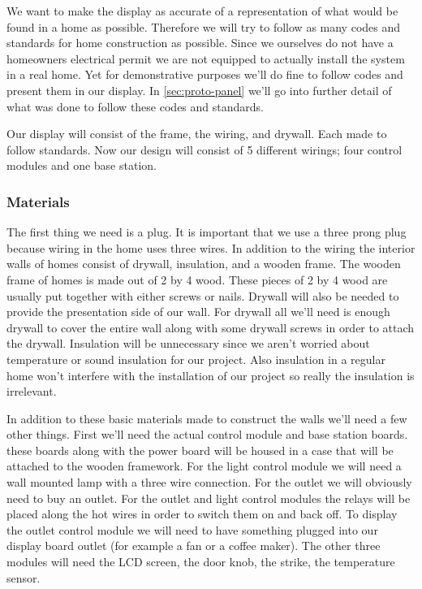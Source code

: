 We want to make the display as accurate of a representation of
what would be found in a home as possible. Therefore we will try to follow as
many codes and standards for home construction as possible. Since we ourselves
do not have a homeowners electrical permit we are not equipped to actually
install the system in a real home. Yet for demonstrative purposes we{}'ll do
fine to follow codes and present them in our display. In \autoref{sec:proto-panel}
we{}'ll go into further detail of what was done to follow these codes and
standards.

Our display will consist of the frame, the wiring, and drywall.
Each made to follow standards. Now our design will consist of 5 different
wirings; four control modules and one base station.

\subsubsection{Materials}
The first thing we need is a plug. It is important that we use a three prong
plug because wiring in the home uses three wires. In addition to the wiring the
interior walls of homes consist of drywall, insulation, and a wooden frame. The
wooden frame of homes is made out of 2 by 4 wood. These pieces of 2 by 4 wood
are usually put together with either screws or nails. Drywall will also be
needed to provide the presentation side of our wall. For drywall all we{}'ll
need is enough drywall to cover the entire wall along with some drywall screws
in order to attach the drywall. Insulation will be unnecessary since we
aren{}'t worried about temperature or sound insulation for our project. Also
insulation in a regular home won{}'t interfere with the installation of our
project so really the insulation is irrelevant.

In addition to these basic materials made to construct the walls
we{}'ll need a few other things. First we{}'ll need the actual control module
and base station boards. these boards along with the power board will be housed
in a case that will be attached to the wooden framework. For the light control
module we will need a wall mounted lamp with a three wire connection. For the
outlet we will obviously need to buy an outlet. For the outlet and light
control modules the relays will be placed along the hot wires in order to
switch them on and back off. To display the outlet control module we will need
to have something plugged into our display board outlet (for example a fan or a
coffee maker). The other three modules will need the LCD screen, the door knob,
the strike, the temperature sensor.


